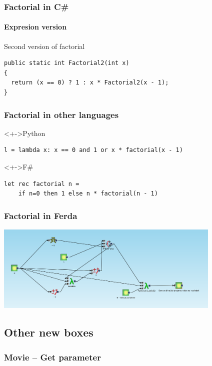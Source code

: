 \documentclass{beamer}
\begin{document}
\begin{frame}[fragile]
	\frametitle{Factorial in C\#}
	\framesubtitle{Expresion version}

	\begin{block}{Second version of factorial}
\begin{verbatim}
public static int Factorial2(int x)
{
  return (x == 0) ? 1 : x * Factorial2(x - 1);
}
\end{verbatim}
	\end{block}
\end{frame}

\begin{frame}[fragile]
        \frametitle{Factorial in other languages}

	\begin{block}<+->{Python}
\begin{verbatim}
l = lambda x: x == 0 and 1 or x * factorial(x - 1)
\end{verbatim}
	\end{block}

	\begin{block}<+->{F\#}
\begin{verbatim}
let rec factorial n =
    if n=0 then 1 else n * factorial(n - 1)
\end{verbatim}
	\end{block}
\end{frame}

\begin{frame}
	\frametitle{Factorial in Ferda}
	\includegraphics[width=10.8cm]{faktorial}
\end{frame}

\subsection{Other new boxes}
\begin{frame}
	\frametitle{Movie -- Get parameter}
\end{frame}
\end{document}
